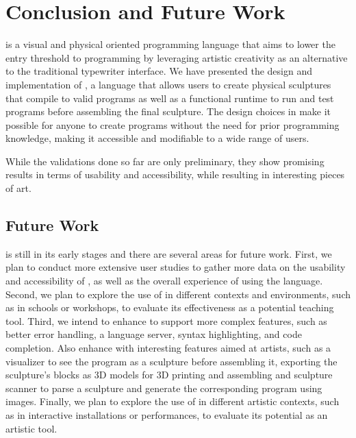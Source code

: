 
\section{Conclusion and Future Work}
\label{sec:conclusion}
\sculpt is a visual and physical oriented programming language that aims to lower the entry threshold to programming by leveraging artistic creativity as an alternative to the traditional typewriter interface.
We have presented the design and implementation of \sculpt, a language that allows users to create physical sculptures that compile to valid programs as well as a functional runtime to run and test programs before assembling the final sculpture.
The design choices in \sculpt make it possible for anyone to create programs without the need for prior programming knowledge, making it accessible and modifiable to a wide range of users.

While the validations done so far are only preliminary, they show promising results in terms of usability and accessibility, while resulting in interesting pieces of art.

\subsection{Future Work}
\sculpt is still in its early stages and there are several areas for future work.
First, we plan to conduct more extensive user studies to gather more data on the usability and accessibility of \sculpt, as well as the overall experience of using the language.
Second, we plan to explore the use of \sculpt in different contexts and environments, such as in schools or workshops, to evaluate its effectiveness as a potential teaching tool.
Third, we intend to enhance \sculpter to support more complex features, such as better error handling, a language server, syntax highlighting, and code completion.
Also enhance \sculpter with interesting features aimed at artists, such as a visualizer to see the program as a sculpture before assembling it, exporting the sculpture's blocks as 3D models for 3D printing and assembling and sculpture scanner to parse a sculpture and generate the corresponding program using images.
Finally, we plan to explore the use of \sculpt in different artistic contexts, such as in interactive installations or performances, to evaluate its potential as an artistic tool.

\endinput

